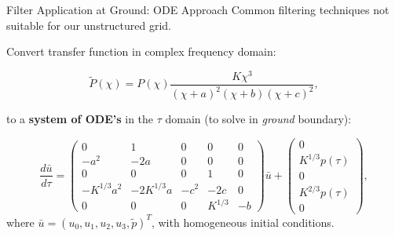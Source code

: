 \documentclass{beamer}
\newcounter{sectionframecount}
\begin{document}
\begin{frame}[t]{Filter Application at Ground: ODE Approach}
\vspace{-10pt}
Common filtering techniques not suitable for our unstructured grid.

{
\vspace{8pt}
Convert transfer function in complex frequency domain:

\begin{equation}
  \tilde{P}(\chi) =P(\chi)\dfrac{K \chi^3}{(\chi+a)^2(\chi+b)(\chi+c)^2},
\end{equation}

to a \textbf{system of ODE's} in the $\tau$ domain (to solve in \textit{ground} boundary):
}

{
\begin{equation}
  \dfrac{d\bar{u}}{d\tau} =
      \begin{pmatrix}
          0 & 1 & 0 & 0 & 0\\
          -a^2 & -2a & 0 & 0 & 0\\
          0 & 0 & 0 & 1 & 0\\
          -K^{1/3}a^2 & -2K^{1/3}a & -c^2 & -2c & 0\\
          0 & 0 & 0 &K^{1/3} & -b
      \end{pmatrix}
      \bar{u}
      +
      \begin{pmatrix}
          0 \\
          K^{1/3}p(\tau)\\
          0\\
          K^{2/3}p(\tau)\\
          0
      \end{pmatrix},
  \end{equation}
where $\bar{u}=(u_0,u_1,u_2,u_3,\tilde{p})^T$, with homogeneous initial conditions.
}
\end{frame}

\end{document}
